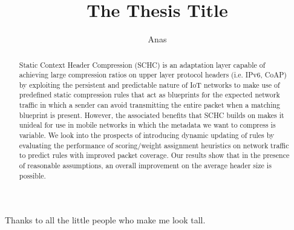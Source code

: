 \documentclass[12pt]{dalthesis}
\begin{document}
\title{The Thesis Title}
\author{Anas}

\bcshon  %


\degreeinitial{}



\nolistoftables
\nolistoffigures

\frontmatter

\begin{abstract}
	Static Context Header Compression (SCHC) is an adaptation layer
capable of achieving large compression ratios on upper layer protocol headers (i.e. IPv6, CoAP) by exploiting the persistent and predictable nature of IoT networks to make use of predefined static compression rules that act as blueprints for the expected network traffic in which a sender can avoid transmitting the entire packet when a matching blueprint is present. However, the associated benefits that SCHC builds on makes it unideal for use in mobile networks in which the metadata we want to compress is variable.
		We look into the prospects of introducing dynamic updating of rules by evaluating the performance of scoring/weight assignment heuristics on
network traffic to predict rules with improved packet coverage. Our results show that in the presence of reasonable assumptions, an overall improvement on the average header size is possible.

\end{abstract}

\begin{acknowledgements}
Thanks to all the little people who make me look tall.
\end{acknowledgements}
\end{document}
